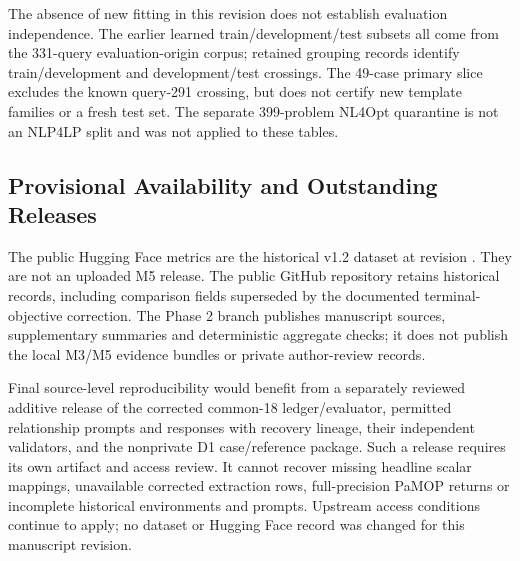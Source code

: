 The absence of new fitting in this revision does not establish evaluation
independence. The earlier learned train/development/test subsets all come
from the 331-query evaluation-origin corpus; retained grouping records
identify train/development and development/test crossings. The 49-case
primary slice excludes the known query-291 crossing, but does not certify
new template families or a fresh test set. The separate 399-problem NL4Opt
quarantine is not an NLP4LP split and was not applied to these tables.

\subsection{Provisional Availability and Outstanding Releases}
The public Hugging Face metrics are the historical v1.2 dataset at revision . They are not an uploaded M5 release. The public GitHub repository retains historical records, including comparison fields superseded by the documented terminal-objective correction. The Phase 2 branch publishes manuscript sources, supplementary summaries and deterministic aggregate checks; it does not publish the local M3/M5 evidence bundles or private author-review records.

Final source-level reproducibility would benefit from a separately reviewed additive release of the corrected common-18 ledger/evaluator, permitted relationship prompts and responses with recovery lineage, their independent validators, and the nonprivate D1 case/reference package. Such a release requires its own artifact and access review. It cannot recover missing headline scalar mappings, unavailable corrected extraction rows, full-precision PaMOP returns or incomplete historical environments and prompts. Upstream access conditions continue to apply; no dataset or Hugging Face record was changed for this manuscript revision.
